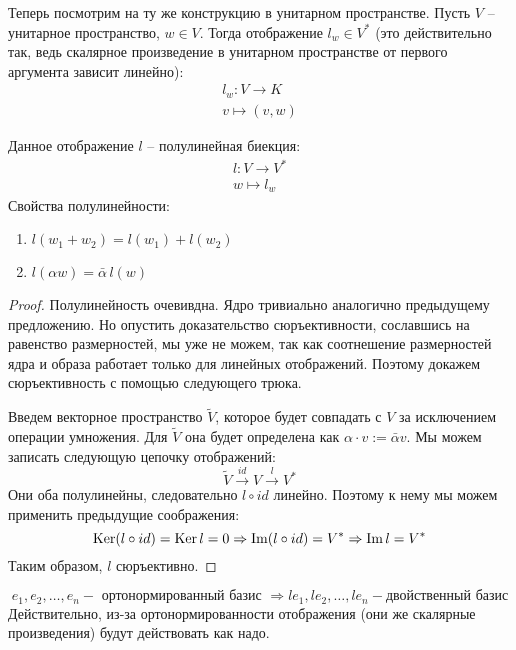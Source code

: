 \vspace*{7mm}

Теперь посмотрим на ту же конструкцию в унитарном пространстве.
Пусть $V$ -- унитарное пространство, $w \in V$. 
Тогда отображение $l_w \in V^*$ (это действительно так, ведь скалярное произведение в унитарном пространстве от первого аргумента зависит линейно): \begin{gather*}
    l_w: V \to K \\
    v \mapsto (v, w)
\end{gather*}
\begin{theorem-non}
    Данное отображение $l$ -- полулинейная биекция: \begin{gather*}
        l: V \to V^* \\
        w \mapsto l_w
    \end{gather*}
    Свойства полулинейности: \begin{enumerate}
        \item $l(w_1 + w_2) = l(w_1) + l(w_2)$
        \item $l(\alpha w) = \bar{\alpha}\, l(w)$
    \end{enumerate}
\end{theorem-non}
\begin{proof}
    Полулинейность очевивдна. 
    Ядро тривиально аналогично предыдущему предложению. 
    Но опустить доказательство сюръективности, сославшись на равенство размерностей, мы уже не можем, так как соотнешение размерностей ядра и образа работает только для линейных отображений.
    Поэтому докажем сюръективность с помощью следующего трюка.

    Введем векторное пространство $\tilde{V}$, которое будет совпадать с $V$ за исключением операции умножения.
    Для $\tilde{V}$ она будет определена как $\alpha \cdot v := \bar{\alpha}v$. 
    Мы можем записать следующую цепочку отображений: \[ \tilde{V} \overset{id}{\to} V \overset{l}{\to} V^* \]
    Они оба полулинейны, следовательно $l \circ id$ линейно. 
    Поэтому к нему мы можем применить предыдущие соображения: \[ \operatorname{Ker}(l \circ id) = \operatorname{Ker} l = 0 \Rightarrow \operatorname{Im}(l \circ id) = V^* \Rightarrow \operatorname{Im} l = V^*  \]
    Таким образом, $l$ сюръективно.
\end{proof}

\begin{notice}
    \[ e_1, e_2, \dots, e_n - \text{ ортонормированный базис } \Rightarrow le_1, le_2, \dots, le_n - \text{двойственный базис} \]
    Действительно, из-за ортонормированности отображения (они же скалярные произведения) будут действовать как надо.
\end{notice}
